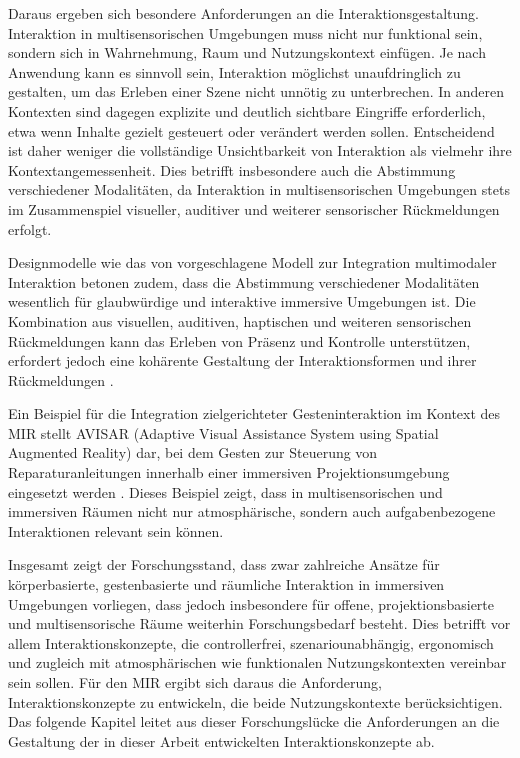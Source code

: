 Daraus ergeben sich besondere Anforderungen an die Interaktionsgestaltung. Interaktion in multisensorischen Umgebungen muss nicht nur funktional sein, sondern sich in Wahrnehmung, Raum und Nutzungskontext einfügen. Je nach Anwendung kann es sinnvoll sein, Interaktion möglichst unaufdringlich zu gestalten, um das Erleben einer Szene nicht unnötig zu unterbrechen. In anderen Kontexten sind dagegen explizite und deutlich sichtbare Eingriffe erforderlich, etwa wenn Inhalte gezielt gesteuert oder verändert werden sollen. Entscheidend ist daher weniger die vollständige Unsichtbarkeit von Interaktion als vielmehr ihre Kontextangemessenheit. Dies betrifft insbesondere auch die Abstimmung verschiedener Modalitäten, da Interaktion in multisensorischen Umgebungen stets im Zusammenspiel visueller, auditiver und weiterer sensorischer Rückmeldungen erfolgt.

Designmodelle wie das von \textcite{vieria2024understandingAffordancesinXR} vorgeschlagene Modell zur Integration multimodaler Interaktion betonen zudem, dass die Abstimmung verschiedener Modalitäten wesentlich für glaubwürdige und interaktive immersive Umgebungen ist. Die Kombination aus visuellen, auditiven, haptischen und weiteren sensorischen Rückmeldungen kann das Erleben von Präsenz und Kontrolle unterstützen, erfordert jedoch eine kohärente Gestaltung der Interaktionsformen und ihrer Rückmeldungen \parencite{vieria2024understandingAffordancesinXR}.

Ein Beispiel für die Integration zielgerichteter Gesteninteraktion im Kontext des MIR stellt AVISAR (Adaptive Visual Assistance System using Spatial Augmented Reality) dar, bei dem Gesten zur Steuerung von Reparaturanleitungen innerhalb einer immersiven Projektionsumgebung eingesetzt werden \parencite{stoll2024avisar, natschke2024display}. Dieses Beispiel zeigt, dass in multisensorischen und immersiven Räumen nicht nur atmosphärische, sondern auch aufgabenbezogene Interaktionen relevant sein können.

Insgesamt zeigt der Forschungsstand, dass zwar zahlreiche Ansätze für körperbasierte, gestenbasierte und räumliche Interaktion in immersiven Umgebungen vorliegen, dass jedoch insbesondere für offene, projektionsbasierte und multisensorische Räume weiterhin Forschungsbedarf besteht. Dies betrifft vor allem Interaktionskonzepte, die controllerfrei, szenariounabhängig, ergonomisch und zugleich mit atmosphärischen wie funktionalen Nutzungskontexten vereinbar sein sollen. Für den MIR ergibt sich daraus die Anforderung, Interaktionskonzepte zu entwickeln, die beide Nutzungskontexte berücksichtigen. Das folgende Kapitel leitet aus dieser Forschungslücke die Anforderungen an die Gestaltung der in dieser Arbeit entwickelten Interaktionskonzepte ab.


